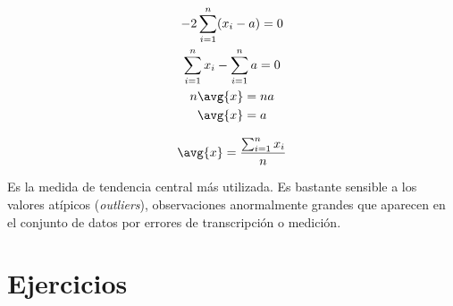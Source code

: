 \documentclass{apuntes}
\begin{document}
\begin{gather*}
-2 \sum_{i=1}^n(x_i-a) = 0 \\
\sum_{i=1}^n x_i - \sum_{i=1}^n a = 0 \\
n \avg{x} = n a \\
\avg{x} = a 
\end{gather*}

\begin{defn}[Media]

\[ \avg{x} = \frac{\sum_{i=1}^n x_i}{n} \]

Es la medida de tendencia central más utilizada. Es bastante sensible a los valores atípicos (\textit{outliers}), observaciones anormalmente grandes que aparecen en el conjunto de datos por errores de transcripción o medición.
\end{defn}

\chapter{Ejercicios}

\end{document}
